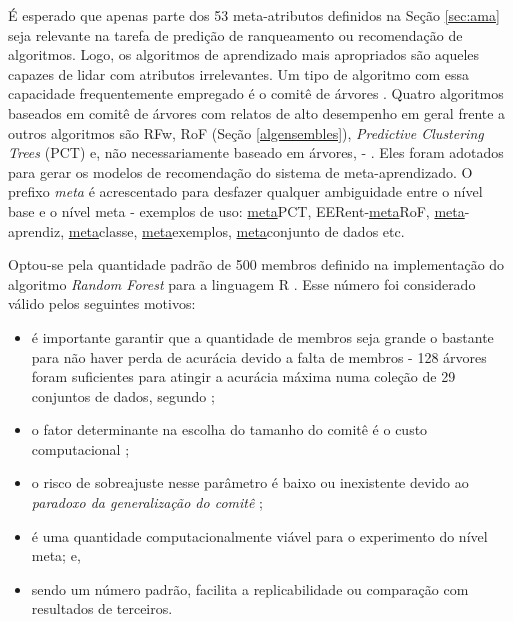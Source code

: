 É esperado que apenas parte dos 53 meta-atributos definidos na Seção \ref{sec:ama} seja relevante na tarefa de predição de ranqueamento ou recomendação de algoritmos.
Logo, os algoritmos de aprendizado mais apropriados são aqueles capazes de lidar com atributos irrelevantes.
Um tipo de algoritmo com essa capacidade frequentemente empregado é o comitê de árvores \cite{strobl2009introduction}.
Quatro algoritmos baseados em comitê de árvores com relatos de alto desempenho em geral \cite{journals/jmlr/DelgadoCBA14} frente a outros algoritmos são RFw, RoF (Seção \ref{algensembles}), \textit{Predictive Clustering Trees} (PCT) e, não necessariamente baseado em árvores,  - \cite{journals/jmlr/DelgadoCBA14,conf/icml/FreundS96,conf/ecml/TodorovskiBD02}.
Eles foram adotados para gerar os modelos de recomendação do sistema de meta-aprendizado.
O prefixo \textit{meta} é acrescentado para desfazer qualquer ambiguidade entre o nível base e o nível meta - exemplos de uso: \ul{meta}PCT, EERent-\ul{meta}RoF, \ul{meta}-aprendiz, \ul{meta}classe, \ul{meta}exemplos, \ul{meta}conjunto de dados etc.

Optou-se pela quantidade padrão de 500 membros definido na implementação do algoritmo \textit{Random Forest} para a linguagem R \cite{team2014r}.
Esse número foi considerado válido pelos seguintes motivos:
\begin{itemize}
   \item é importante garantir que a quantidade de membros seja grande o bastante para não haver perda de acurácia devido a falta de membros - 128 árvores foram suficientes para atingir a acurácia máxima numa coleção de 29 conjuntos de dados, segundo ;
   \item o fator determinante na escolha do tamanho do comitê é o custo computacional \cite{conf/mldm/OshiroPB12};
   \item o risco de sobreajuste nesse parâmetro é baixo ou inexistente devido ao \textit{paradoxo da generalização do comitê} \cite{elder2003generalization,series/synthesis/2010Seni};
   \item é uma quantidade computacionalmente viável para o experimento do nível meta; e,
   \item sendo um número padrão, facilita a replicabilidade ou comparação com resultados de terceiros.
\end{itemize}


